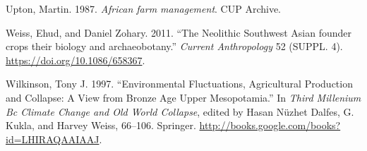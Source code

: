 \documentclass[smallextended]{svjour3}       %
\begin{document}
\leavevmode\hypertarget{ref-Upton1987}{}%
Upton, Martin. 1987. \emph{African farm management}. CUP Archive.

\leavevmode\hypertarget{ref-Weiss2011}{}%
Weiss, Ehud, and Daniel Zohary. 2011. ``The Neolithic Southwest Asian founder crops their biology and archaeobotany.'' \emph{Current Anthropology} 52 (SUPPL. 4). \url{https://doi.org/10.1086/658367}.

\leavevmode\hypertarget{ref-Wilkinson1997}{}%
Wilkinson, Tony J. 1997. ``Environmental Fluctuations, Agricultural Production and Collapse: A View from Bronze Age Upper Mesopotamia.'' In \emph{Third Millenium Bc Climate Change and Old World Collapse}, edited by Hasan Nüzhet Dalfes, G. Kukla, and Harvey Weiss, 66--106. Springer. \url{http://books.google.com/books?id=LHIRAQAAIAAJ}.



\end{document}
